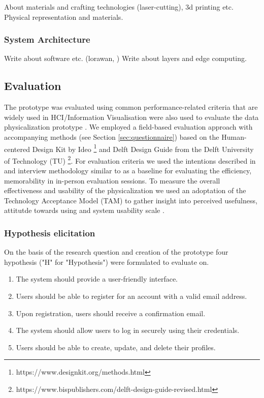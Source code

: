 About materials and crafting technologies (laser-cutting), 3d printing etc. Physical representation and materials.

\subsubsection{System Architecture}

Write about software etc. (lorawan, ) Write about layers and edge computing. 

\subsection{Evaluation}

The prototype was evaluated using common performance-related criteria that are widely used in HCI/Information Visualisation were also used to evaluate the data physicalization prototype \cite{ranasinghe_encoding_2023}. We employed a field-based evaluation approach with accompanying methods (see Section \ref{sec:questionnaire}) based on the Human-centered Design Kit by Ideo \footnote{https://www.designkit.org/methods.html} and Delft Design Guide from the Delft University of Technology (TU) \footnote{https://www.bispublishers.com/delft-design-guide-revised.html}.  For evaluation criteria we used the intentions described in \cite{ranasinghe_encoding_2023} and interview methodology similar to \cite{jansen_evaluating_2013} as a baseline for evaluating the efficiency, memorability in in-person evaluation sessions. To measure the overall effectiveness and usability of the physicalization we used an adoptation of the Technology Acceptance Model (TAM) to gather insight into perceived usefulness, attitutde towards using and system usability scale \cite{}. 

\subsubsection{Hypothesis elicitation}

On the basis of the research question and creation of the prototype four hypothesis ("H" for "Hypothesis") were formulated to evaluate on.

\begin{enumerate}
    \renewcommand{\labelenumi}{H\arabic{enumi}:}
    \item The system should provide a user-friendly interface.
    \item Users should be able to register for an account with a valid email address.
    \item Upon registration, users should receive a confirmation email.
    \item The system should allow users to log in securely using their credentials.
    \item Users should be able to create, update, and delete their profiles.
\end{enumerate}

